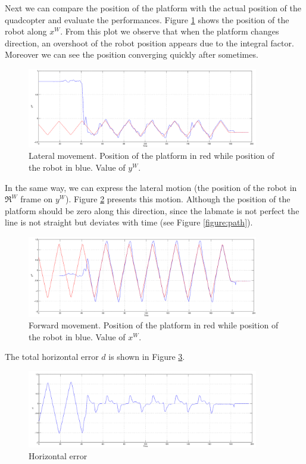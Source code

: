 Next we can compare the position of the platform with the actual position of the quadcopter and evaluate the performances. Figure \ref{figure:forward} shows the position of the robot along $x^W$. From this plot we observe that when the platform changes direction, an overshoot of the robot position appears due to the integral factor. Moreover we can see the position converging quickly after sometimes. 
 
   \begin{figure}[h]
    \centering
      \includegraphics[width = 0.9\textwidth ]{wy.png}
       \caption[Lateral movement]{Lateral movement. Position of the platform in red while position of the robot in blue. Value of $y^W$.}
      \label{figure:forward}
   \end{figure}
   
\noindent
In the same way, we can express the lateral motion (the position of the robot in $\Re^W$ frame on $y^W$). Figure \ref{figure:lateral} presents this motion. Although the position of the platform should be zero along this direction, since the labmate is not perfect the line is not straight but deviates with time (see Figure \ref{figure:path}).
  \begin{figure}[H]
    \centering
      \includegraphics[width = 0.9\textwidth ]{wx.png}
       \caption[Lateral movement]{Forward movement. Position of the platform in red while position of the robot in blue. Value of $x^W$.}
      \label{figure:lateral}
   \end{figure}
   
\noindent
The total horizontal error $d$ is shown in Figure \ref{figure:err}.
\begin{figure}[h]
    \centering
      \includegraphics[width = 0.9\textwidth]{d.png}
       \caption{Horizontal error }
      \label{figure:err}
\end{figure}

